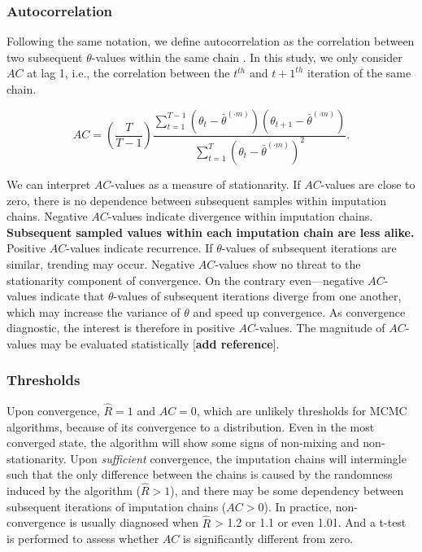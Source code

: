 \documentclass[Royal,times,sageh]{sagej}
\begin{document}
\hypertarget{autocorrelation}{%
\subsubsection{Autocorrelation}\label{autocorrelation}}

Following the same notation, we define autocorrelation as the correlation between two subsequent \(\theta\)-values within the same chain \citep[p.~147]{lync07}. In this study, we only consider \(AC\) at lag 1, i.e., the correlation between the \(t^{th}\) and \(t+1^{th}\) iteration of the same chain.

\begin{equation*}
AC = \left( \frac{T}{T-1} \right) \frac{\sum_{t=1}^{T-1}(\theta_t - \bar{\theta}^{(\cdot m)})(\theta_{t+1} - \bar{\theta}^{(\cdot m)})}{\sum_{t=1}^{T}(\theta_t - \bar{\theta}^{(\cdot m)})^2}.
\end{equation*}

We can interpret \(AC\)-values as a measure of stationarity. If \(AC\)-values are close to zero, there is no dependence between subsequent samples within imputation chains. Negative \(AC\)-values indicate divergence within imputation chains. \textbf{Subsequent sampled values within each imputation chain are less alike.} Positive \(AC\)-values indicate recurrence. If \(\theta\)-values of subsequent iterations are similar, trending may occur. Negative \(AC\)-values show no threat to the stationarity component of convergence. On the contrary even---negative \(AC\)-values indicate that \(\theta\)-values of subsequent iterations diverge from one another, which may increase the variance of \(\theta\) and speed up convergence. As convergence diagnostic, the interest is therefore in positive \(AC\)-values. The magnitude of \(AC\)-values may be evaluated statistically {[}\textbf{add reference}{]}.

\hypertarget{thresholds}{%
\subsubsection{Thresholds}\label{thresholds}}

Upon convergence, \(\widehat{R}=1\) and \(AC=0\), which are unlikely thresholds for MCMC algorithms, because of its convergence to a distribution. Even in the most converged state, the algorithm will show some signs of non-mixing and non-stationarity. Upon \emph{sufficient} convergence, the imputation chains will intermingle such that the only difference between the chains is caused by the randomness induced by the algorithm (\(\widehat{R} > 1\)), and there may be some dependency between subsequent iterations of imputation chains (\(AC > 0\)). In practice, non-convergence is usually diagnosed when \(\widehat{R}\) \textgreater{} 1.2 or 1.1 or even 1.01. And a t-test is performed to assess whether \(AC\) is significantly different from zero.
\end{document}
